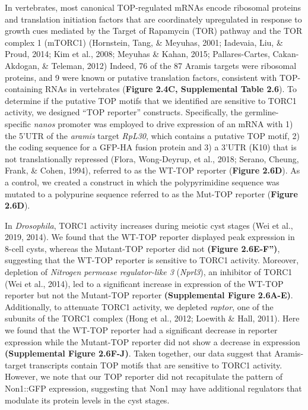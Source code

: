 \documentclass[12pt,twoside]{reedthesis}
\begin{document}
In vertebrates, most canonical TOP-regulated mRNAs encode ribosomal
proteins and translation initiation factors that are coordinately
upregulated in response to growth cues mediated by the Target of
Rapamycin (TOR) pathway and the TOR complex 1 (mTORC1)
(Hornstein, Tang, \& Meyuhas, 2001; Iadevaia, Liu, \& Proud, 2014; Kim et al., 2008; Meyuhas \& Kahan, 2015; Pallares-Cartes, Cakan-Akdogan, \& Teleman, 2012) Indeed, 76 of the
87 Aramis targets were ribosomal proteins, and 9 were known or putative
translation factors, consistent with TOP-containing RNAs in vertebrates
(\textbf{Figure 2.4C, Supplemental Table 2.6}). To determine if the putative TOP
motifs that we identified are sensitive to TORC1 activity, we designed
``TOP reporter'' constructs. Specifically, the germline-specific \emph{nanos}
promoter was employed to drive expression of an mRNA with 1) the 5'UTR
of the \emph{aramis} target \emph{RpL30}, which contains a putative TOP motif, 2)
the coding sequence for a GFP-HA fusion protein and 3) a 3'UTR (K10)
that is not translationally repressed (Flora, Wong-Deyrup, et al., 2018; Serano, Cheung, Frank, \& Cohen, 1994), referred to as the WT-TOP
reporter (\textbf{Figure 2.6D}). As a control, we created a construct in which
the polypyrimidine sequence was mutated to a polypurine sequence
referred to as the Mut-TOP reporter (\textbf{Figure 2.6D}).

In \emph{Drosophila}, TORC1 activity increases during meiotic cyst stages
(Wei et al., 2019, 2014). We found that the WT-TOP reporter displayed
peak expression in 8-cell cysts, whereas the Mutant-TOP reporter did not
\textbf{(Figure 2.6E-F'')}, suggesting that the WT-TOP reporter is sensitive to
TORC1 activity. Moreover, depletion of \emph{Nitrogen permease regulator-like
3} (\emph{Nprl3}), an inhibitor of TORC1 (Wei et al., 2014), led to a significant
increase in expression of the WT-TOP reporter but not the Mutant-TOP
reporter \textbf{(Supplemental Figure 2.6A-E)}. Additionally, to attenuate TORC1 activity,
we depleted \emph{raptor}, one of the subunits of the TORC1 complex
(Hong et al., 2012; Loewith \& Hall, 2011). Here we found that the WT-TOP
reporter had a significant decrease in reporter expression while the
Mutant-TOP reporter did not show a decrease in expression \textbf{(Supplemental Figure 2.6F-J)}.
Taken together, our data suggest that Aramis-target
transcripts contain TOP motifs that are sensitive to TORC1 activity.
However, we note that our TOP reporter did not recapitulate the pattern
of Non1::GFP expression, suggesting that Non1 may have additional
regulators that modulate its protein levels in the cyst stages.
\end{document}
